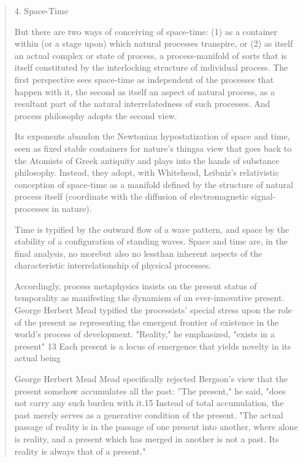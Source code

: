 \documentclass[a4paper]{Thesis}
\begin{document}
	\begin{quotation}
		4. Space-Time
		
		But there are two ways of conceiving of space-time: (1) as a container within (or a stage
		upon) which natural processes transpire, or (2) as itself an actual complex or state of
		process, a process-manifold of sorts that is itself constituted by the interlocking structure
		of individual process. The first perspective sees space-time as independent of the
		processes that happen with it, the second as itself an aspect of natural process, as a
		resultant part of the natural interrelatedness of such processes. And process philosophy
		adopts the second view.
		
		Its exponents abandon the Newtonian hypostatization of space
		and time, seen as fixed stable containers for nature's thingsa view that goes back to the
		Atomists of Greek antiquity and plays into the hands of substance philosophy. Instead,
		they adopt, with Whitehead, Leibniz's relativistic conception of space-time as a manifold
		defined by the structure of natural process itself (coordinate with the diffusion of
		electromagnetic signal-processes in nature).
		
		Time is typified
		by the outward flow of a wave pattern, and space by the stability of a configuration of
		standing waves. Space and time are, in the final analysis, no morebut also no lessthan
		inherent aspects of the characteristic interrelationship of physical processes.
		
		Accordingly, process metaphysics insists on the present status of temporality as
		manifesting the dynamism of an ever-innovative present. George Herbert Mead typified
		the processists' special stress upon the role of the present as representing the emergent
		frontier of existence in the world's process of development. "Reality," he emphasized,
		"exists in a present" 13 Each present is a locus of emergence that yields novelty in its
		actual being
		
		George Herbert Mead
		Mead specifically rejected Bergson's view that
		the present somehow accumulates all the past: ''The present," he said, "does not carry
		any such burden with it.15 Instead of total accumulation, the past merely serves
		as a generative condition of the present. "The actual passage of reality is in the passage
		of one present into another, where alone is reality, and a present which has merged in
		another is not a past. Its reality is always that of a present."
		

\end{quotation}
\end{document}
